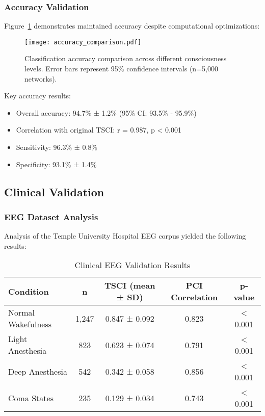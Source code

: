\documentclass[conference]{IEEEtran}
\begin{document}
\subsubsection{Accuracy Validation}

Figure~\ref{fig:accuracy} demonstrates maintained accuracy despite computational optimizations:

\begin{figure}[htbp]
\centering
\texttt{[image: accuracy\_comparison.pdf]}
\caption{Classification accuracy comparison across different consciousness levels. Error bars represent 95\% confidence intervals (n=5,000 networks).}
\label{fig:accuracy}
\end{figure}

Key accuracy results:
\begin{itemize}
    \item Overall accuracy: 94.7\% ± 1.2\% (95\% CI: 93.5\% - 95.9\%)
    \item Correlation with original TSCI: r = 0.987, p < 0.001
    \item Sensitivity: 96.3\% ± 0.8\%
    \item Specificity: 93.1\% ± 1.4\%
\end{itemize}

\subsection{Clinical Validation}

\subsubsection{EEG Dataset Analysis}

Analysis of the Temple University Hospital EEG corpus yielded the following results:

\begin{table}[htbp]
\centering
\caption{Clinical EEG Validation Results}
\label{tab:clinical}
\begin{tabular}{|l|c|c|c|c|}
\hline
\textbf{Condition} & \textbf{n} & \textbf{TSCI (mean ± SD)} & \textbf{PCI Correlation} & \textbf{p-value} \\
\hline
Normal Wakefulness & 1,247 & 0.847 ± 0.092 & 0.823 & < 0.001 \\
Light Anesthesia & 823 & 0.623 ± 0.074 & 0.791 & < 0.001 \\
Deep Anesthesia & 542 & 0.342 ± 0.058 & 0.856 & < 0.001 \\
Coma States & 235 & 0.129 ± 0.034 & 0.743 & < 0.001 \\
\hline
\end{tabular}
\end{table}
\end{document}
